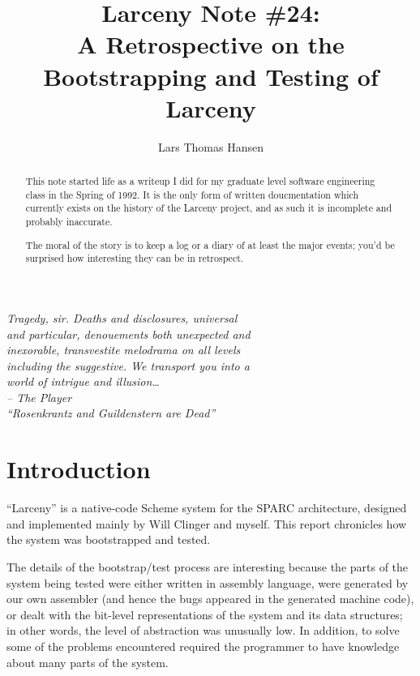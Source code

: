 
\newcommand{\reg}[1]{{\sc \%#1}}

\topmargin      -1.5cm
\oddsidemargin   0.0cm
\evensidemargin  0.0cm
\textwidth      6.5in
\textheight     9.0in
\parindent       0.0cm
\parskip         0.4cm

\title{Larceny Note \#24: \\
A Retrospective on the Bootstrapping and Testing of Larceny}
\author{Lars Thomas Hansen}

\maketitle

\begin{abstract}
This note started life as a writeup I did for my graduate level software
engineering class in the Spring of 1992. It is the only form of written
doucmentation which currently exists on the history of the Larceny project,
and as such it is incomplete and probably inaccurate.

The moral of the story is to keep a log or a diary of at least the major
events; you'd be surprised how interesting they can be in retrospect.
\end{abstract}

\begin{flushright}
\em
Tragedy, sir. Deaths and disclosures, universal \\
and particular, denouements both unexpected and \\
inexorable, transvestite melodrama on all levels \\
including the suggestive. We transport you into a \\
world of intrigue and illusion\ldots \\
\medskip
-- The Player \\
``Rosenkrantz and Guildenstern are Dead''
\end{flushright}

\section{Introduction}

``Larceny'' is a native-code Scheme system for the SPARC architecture,
designed and implemented mainly by Will Clinger and myself. This report
chronicles how the system was bootstrapped and tested.

The details of the bootstrap/test process are interesting because the parts
of the system being tested were either written in assembly language, were
generated by our own assembler (and hence the bugs appeared in the generated
machine code), or dealt with the bit-level representations of the system and
its data structures; in other words, the level of abstraction was unusually
low. In addition, to solve some of the problems encountered required the
programmer to have knowledge about many parts of the system.

